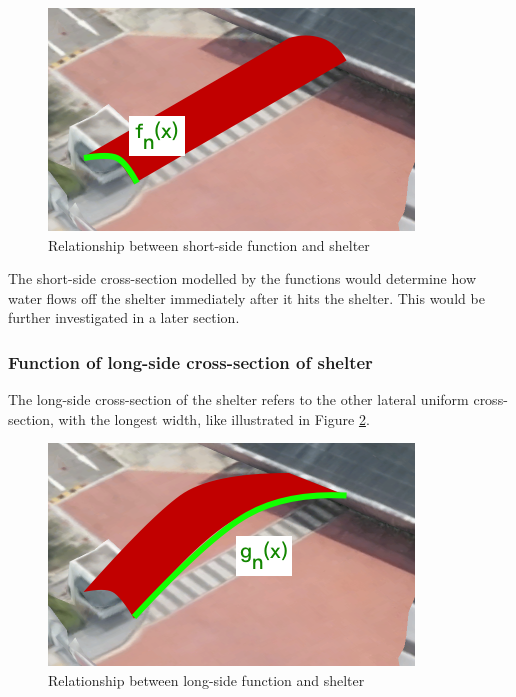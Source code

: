 \documentclass[a4paper,titlepage]{article}
\begin{document}
\begin{figure}[htbp]
    \centering
    \includegraphics[width=\textwidth]{shortSideFunction.png}
    \caption{Relationship between short-side function and shelter}
    \label{fig:shortSideFunction}
\end{figure}

The short-side cross-section modelled by the functions would determine how water flows off the shelter immediately after it hits the shelter. This would be further investigated in a later section.

\subsubsection{Function of long-side cross-section of shelter}
The long-side cross-section of the shelter refers to the other lateral uniform cross-section, with the longest width, like illustrated in Figure \ref{fig:longSideFunction}.

\begin{figure}[htbp]
    \centering
    \includegraphics[width=\textwidth]{longSideFunction.png}
    \caption{Relationship between long-side function and shelter}
    \label{fig:longSideFunction}
\end{figure}
\end{document}
